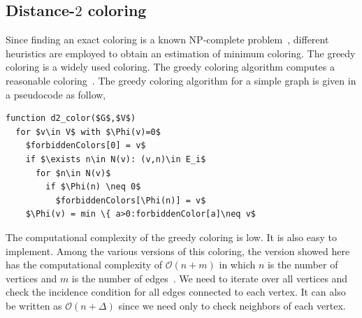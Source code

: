 \documentclass[12pt, oneside]{book}
\begin{document}
\subsection{Distance-$2$ coloring}
Since finding an exact coloring is a known NP-complete problem~\cite{SPINRAD198589},
different heuristics are employed to obtain an estimation of minimum coloring. The greedy coloring is a widely used coloring. The greedy coloring algorithm computes a reasonable coloring~\cite{spaa14}.
The greedy coloring algorithm for a simple graph is given in a pseudocode as follow,
\begin{lstlisting}[caption=New coloring heuristc.,label=code.greedy,mathescape]
function d2_color($G$,$V$)
  for $v\in V$ with $\Phi(v)=0$
    $forbiddenColors[0] = v$
    if $\exists n\in N(v): (v,n)\in E_i$ 
      for $n\in N(v)$
        if $\Phi(n) \neq 0$
          $forbiddenColors[\Phi(n)] = v$
    $\Phi(v) = min \{ a>0:forbiddenColor[a]\neq v$
\end{lstlisting}
The computational complexity of the greedy coloring is low. It is 
also easy to implement. Among the various versions of this coloring, 
the version showed here has the computational complexity of 
$\mathcal{O}(n + m)$ in which $n$ is the number of vertices 
and $m$ is the number of edges~\cite{ordering1}.
We need to iterate over all vertices and check the incidence condition for all edges connected to each vertex. It can also be written as $\mathcal{O}(n + \Delta)$ since we need only to check neighbors of each vertex.
\end{document}
